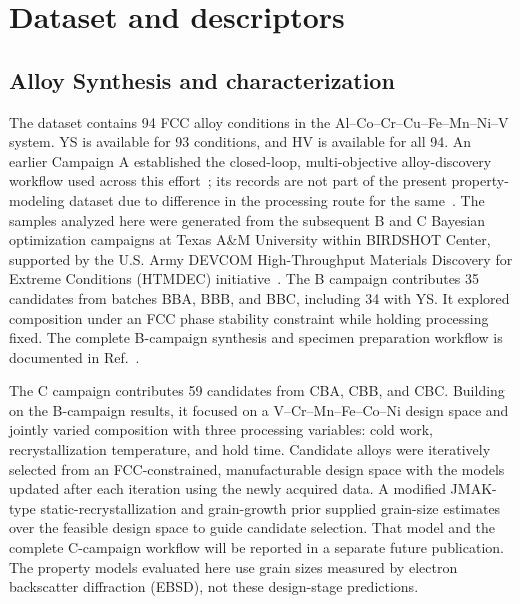 \documentclass[5p,times,twocolumn]{elsarticle}
\begin{document}
\section{Dataset and descriptors}
\label{sec:data}

\subsection{Alloy Synthesis and characterization}

The dataset contains 94 FCC alloy conditions in the Al--Co--Cr--Cu--Fe--Mn--Ni--V system. YS is available for 93 conditions, and HV is available for all 94. An earlier Campaign A established the closed-loop, multi-objective alloy-discovery workflow used across this effort~\cite{Hastings2025FCC}; its records are not part of the present property-modeling dataset due to difference in the processing route for the same~\cite{Hastings2025FCC}. The samples analyzed here were generated from the subsequent B and C Bayesian optimization campaigns at Texas A\&M University within BIRDSHOT Center, supported by the U.S. Army DEVCOM High-Throughput Materials Discovery for Extreme Conditions (HTMDEC) initiative~\cite{Mulukutla2024BIRDSHOT,Mulukutla2026BRAVE}. The B campaign contributes 35 candidates from batches BBA, BBB, and BBC, including 34 with YS. It explored composition under an FCC phase stability constraint while holding processing fixed. The complete B-campaign synthesis and specimen preparation workflow is documented in Ref.~\cite{Mulukutla2026BRAVE}.

The C campaign contributes 59 candidates from CBA, CBB, and CBC. Building on the B-campaign results, it focused on a V--Cr--Mn--Fe--Co--Ni design space and jointly varied composition with three processing variables: cold work, recrystallization temperature, and hold time. Candidate alloys were iteratively selected from an FCC-constrained, manufacturable design space with the models updated after each iteration using the newly acquired data. A modified JMAK-type static-recrystallization and grain-growth prior supplied grain-size estimates over the feasible design space to guide candidate selection. That model and the complete C-campaign workflow will be reported in a separate future publication. The property models evaluated here use grain sizes measured by electron backscatter diffraction (EBSD), not these design-stage predictions.
\end{document}

